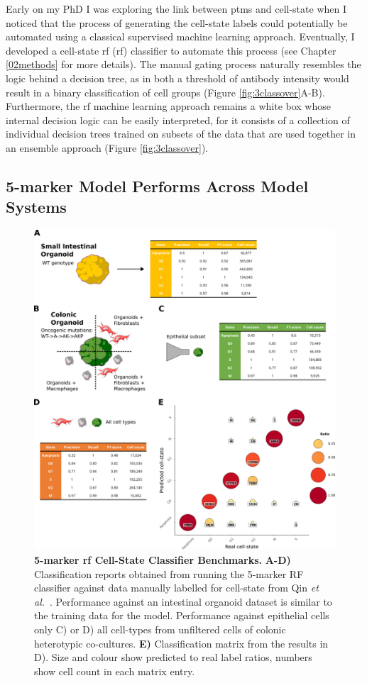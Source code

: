 Early on my PhD I was exploring the link between \acrshort{ptm}s and cell-state when I noticed that the process of generating the cell-state labels could potentially be automated using a classical supervised machine learning approach. Eventually, I developed a cell-state \acrlong{rf} (\acrshort{rf}) classifier to automate this process (see Chapter \ref{02methods} for more details). The manual gating process naturally resembles the logic behind a decision tree, as in both a threshold of antibody intensity would result in a binary classification of cell groups (Figure \ref{fig:3classover}A-B). Furthermore, the \acrshort{rf} machine learning approach remains a white box whose internal decision logic can be easily interpreted, for it consists of a collection of individual decision trees trained on subsets of the data that are used together in an ensemble approach (Figure \ref{fig:3classover}).

\subsection{5-marker Model Performs Across Model Systems}

\begin{figure}
    \centering
    \includegraphics{03cytof/figs/3CLASS_5m.png}
    \caption{\textbf{5-marker \acrshort{rf} Cell-State Classifier Benchmarks.} \textbf{A-D)} Classification reports obtained from running the 5-marker RF classifier against data manually labelled for cell-state from Qin \emph{et al.}~\cite{qin_cell-type-specific_2020}. Performance against an intestinal organoid dataset is similar to the training data for the model. Performance against epithelial cells only C) or D) all cell-types from unfiltered cells of colonic heterotypic co-cultures. \textbf{E)} Classification matrix from the results in D). Size and colour show predicted to real label ratios, numbers show cell count in each matrix entry.}
    \label{fig:3class5m}
\end{figure}

